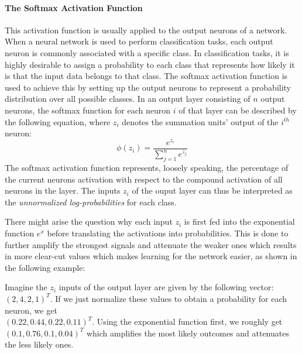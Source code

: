 \paragraph{The Softmax Activation Function}
\label{sec:softmax}
This activation function is usually applied to the output neurons of
a network. When a neural network is used to perform classification
tasks, each output neuron is commonly associated with a specific
class. In classification tasks, it is highly desirable to assign a
probability to each class that represents how likely it is that the
input data belongs to that class. The softmax activation function is
used to achieve this by setting up the output neurons to represent a
probability distribution over all possible classes.
In an output layer consisting of \(n\) output neurons, the softmax
function for each neuron \(i\) of that layer can be described by the
following equation, where \(z_i\) denotes the summation units' output of
the \(i^{th}\) neuron:
\begin{equation}
  \phi(z_i) = \frac{e^{z_i}}{\sum_{j=1}^{n}{e^{z_j}}}
\end{equation}
The softmax activation function represents, loosely speaking, the
percentage of the current neurons activation with respect to the compound
activation of all neurons in the layer. The inputs \(z_i\) of the
ouput layer can thus be interpreted as the \textit{unnormalized
  log-probabilities} for each class.

There might arise the question why each input \(z_i\) is first fed
into the exponential function \(e^x\) before translating the
activations into probabilities. This is done to further amplify the
strongest signals and attenuate the weaker ones which results in more
clear-cut values which makes learning for the network easier, as shown
in the following example:

Imagine the \(z_i\) inputs of the output
layer are given by the following vector: \((2, 4, 2, 1)^T\). If we
just normalize these values to obtain a probability for each neuron,
we get\\\((0.22, 0.44, 0.22, 0.11)^T\). Using the exponential
function first, we roughly get\\\((0.1, 0.76, 0.1, 0.04)^T\) which
amplifies the most likely outcomes and attenuates the less likely
ones.

